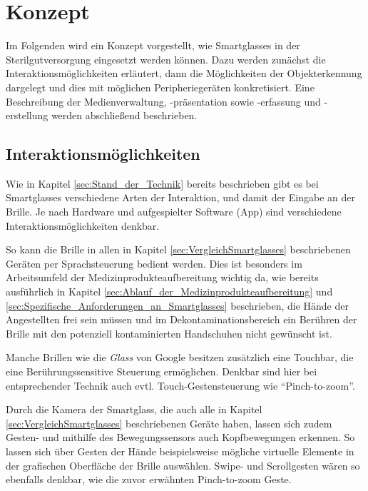 %
%
%
%
%
%
\chapter{Konzept}
\label{ch:Konzept}
Im Folgenden wird ein Konzept vorgestellt, wie Smartglasses in der Sterilgutversorgung eingesetzt werden können. Dazu werden zunächst die Interaktionsmöglichkeiten erläutert, dann die Möglichkeiten der Objekterkennung dargelegt und dies mit möglichen Peripheriegeräten konkretisiert. Eine Beschreibung der Medienverwaltung, -präsentation sowie -erfassung und -erstellung werden abschließend beschrieben.
%
%
%
%
%
%
\section{Interaktionsmöglichkeiten}
\label{sec:Interaktionsmoeglichkeiten}
Wie in Kapitel \ref{sec:Stand_der_Technik} bereits beschrieben gibt es bei Smartglasses verschiedene Arten der Interaktion, und damit der Eingabe an der Brille. Je nach Hardware und aufgespielter Software (App) sind verschiedene Interaktionsmöglichkeiten denkbar. 

So kann die Brille in allen in Kapitel \ref{sec:VergleichSmartglasses} beschriebenen Geräten per Sprachsteuerung bedient werden. Dies ist besonders im Arbeitsumfeld der Medizinprodukteaufbereitung wichtig da, wie bereits ausführlich in Kapitel \ref{sec:Ablauf_der_Medizinprodukteaufbereitung} und \ref{sec:Spezifische_Anforderungen_an_Smartglasses} beschrieben, die Hände der Angestellten frei sein müssen und im Dekontaminationsbereich ein Berühren der Brille mit den potenziell kontaminierten Handschuhen nicht gewünscht ist.

Manche Brillen wie die \emph{Glass} von Google besitzen zusätzlich eine Touchbar, die eine Berührungssensitive Steuerung ermöglichen. Denkbar sind hier bei entsprechender Technik auch evtl. Touch-Gestensteuerung wie \enquote{Pinch-to-zoom}.

Durch die Kamera der Smartglass, die auch alle in Kapitel \ref{sec:VergleichSmartglasses} beschriebenen Geräte haben, lassen sich zudem Gesten- und mithilfe des Bewegungssensors auch Kopfbewegungen erkennen. So lassen sich über Gesten der Hände beispielsweise mögliche virtuelle Elemente in der grafischen Oberfläche der Brille auswählen. Swipe- und Scrollgesten wären so ebenfalls denkbar, wie die zuvor erwähnten Pinch-to-zoom Geste.

